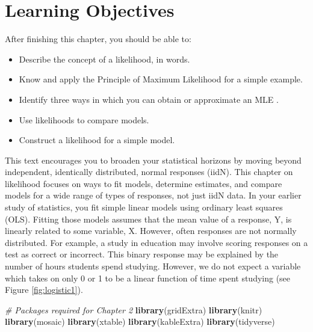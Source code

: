 \documentclass[
]{krantz}
\newenvironment{Shaded}{\begin{snugshade}}{\end{snugshade}}
\newcommand{\CommentTok}[1]{\textcolor[rgb]{0.37,0.37,0.37}{\textit{#1}}}
\newcommand{\FunctionTok}[1]{\textcolor[rgb]{0.27,0.27,0.27}{\textbf{#1}}}
\newcommand{\NormalTok}[1]{#1}
\providecommand{\tightlist}{%
  \setlength{\itemsep}{0pt}\setlength{\parskip}{0pt}}
\begin{document}
\section{Learning Objectives}\label{learning-objectives-1}

After finishing this chapter, you should be able to:

\begin{itemize}
\tightlist
\item
  Describe the concept of a likelihood, in words.
\item
  Know and apply the Principle of Maximum Likelihood for a simple example.
\item
  Identify three ways in which you can obtain or approximate an MLE .
\item
  Use likelihoods to compare models.
\item
  Construct a likelihood for a simple model.
\end{itemize}

This text encourages you to broaden your statistical horizons by moving beyond independent, identically distributed, normal responses (iidN). This chapter on likelihood focuses on ways to fit models, determine estimates, and compare models for a wide range of types of responses, not just iidN data. In your earlier study of statistics, you fit simple linear models using ordinary least squares (OLS). Fitting those models assumes that the mean value of a response, Y, is linearly related to some variable, X. However, often responses are not normally distributed. For example, a study in education may involve scoring responses on a test as correct or incorrect. This binary response may be explained by the number of hours students spend studying. However, we do not expect a variable which takes on only 0 or 1 to be a linear function of time spent studying (see Figure \ref{fig:logistic1}).

\begin{Shaded}
\begin{Highlighting}[]
\CommentTok{\# Packages required for Chapter 2}
\FunctionTok{library}\NormalTok{(gridExtra)  }
\FunctionTok{library}\NormalTok{(knitr) }
\FunctionTok{library}\NormalTok{(mosaic)}
\FunctionTok{library}\NormalTok{(xtable)}
\FunctionTok{library}\NormalTok{(kableExtra)}
\FunctionTok{library}\NormalTok{(tidyverse) }
\end{Highlighting}
\end{Shaded}
\end{document}
